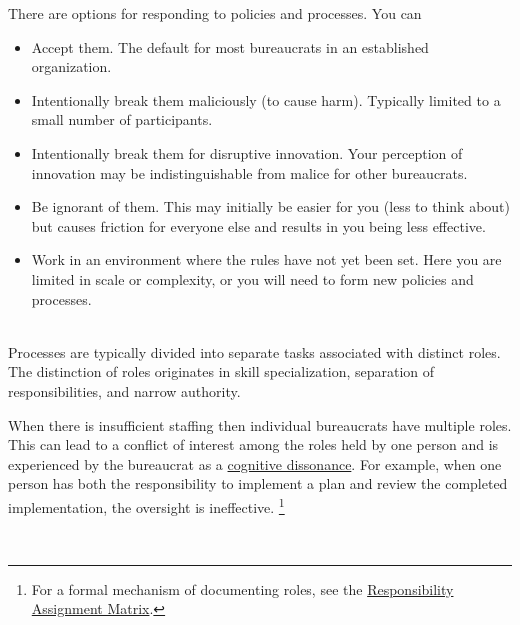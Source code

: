 There are options for responding to policies and processes. You can
\begin{itemize}
    \item Accept them. The default for most bureaucrats in an established organization.
    \item Intentionally break them maliciously (to cause harm). Typically limited to a small number of participants. %
    \item Intentionally break them for disruptive innovation. Your perception of innovation may be indistinguishable from malice for other bureaucrats. 
    \item Be ignorant of them. This may initially be easier for you (less to think about) but causes friction for everyone else and results in you being less effective.
    \item Work in an environment where the rules have not yet been set. Here you are limited in scale or complexity, or you will need to form new policies and processes.
\end{itemize}

\ \\

Processes are typically divided into separate tasks associated with distinct roles. The distinction of roles originates in skill specialization, separation of responsibilities, and narrow authority. 

When there is insufficient staffing then individual bureaucrats have multiple roles. This can lead to a conflict of interest among the roles held by one person and is experienced by the bureaucrat as a \href{https://en.wikipedia.org/wiki/Cognitive_dissonance}{cognitive dissonance}. 
For example, when one person has both the responsibility to implement a plan and review the completed implementation, the oversight is ineffective. \footnote{For a formal mechanism of documenting roles, see the 
\href{https://en.wikipedia.org/wiki/Responsibility_assignment_matrix}{Responsibility Assignment Matrix}.
}

\ \\

